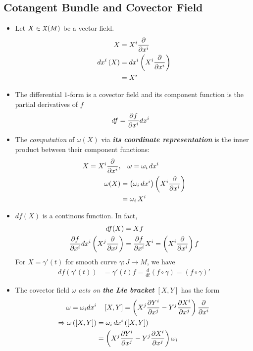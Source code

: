 \documentclass[11pt]{article}
\begin{document}
\subsection{Cotangent Bundle and Covector Field}
\begin{itemize}
\item Let $X \in {\mathfrak X}(M)$ be a vector field. 
\begin{align}
X &=X^i \frac{\partial }{ \partial x^i} \nonumber\\
dx^i \left(X\right) &= dx^i \left(X^i \frac{\partial }{ \partial x^i}\right) \nonumber\\
&= X^i \label{eqn: basis_covector_field_on_vector_field}
\end{align}

\item The differential $1$-form is a covector field and its component function is the partial derivatives of $f$
\begin{align*}
df &= \frac{\partial f}{ \partial x^i} dx^i
\end{align*}

\item The \emph{computation} of $\omega(X)$ via \emph{\textbf{its coordinate representation}} is the inner product between their component functions:
\begin{align}
X = X^i \frac{\partial }{ \partial x^i},&\quad \omega = \omega_i\, dx^i  \nonumber\\
\omega(X) &= \left(\omega_i \, dx^{i}\right)\left(X^i \frac{\partial }{ \partial x^i}\right) \nonumber\\
&= \omega_i\,X^i  \label{eqn: covector_field_act_on_vector_field_coordinate}
\end{align}

\item $df(X)$ is a continous function. In fact, 
\begin{align*}
df(X) &= Xf \\
\frac{\partial f}{ \partial x^i}dx^i\left(X^j \frac{\partial }{ \partial x^j}\right) &= \frac{\partial f}{ \partial x^i}X^i = \left(X^i \frac{\partial }{ \partial x^i}\right)f
\end{align*} For $X = \gamma'(t)$ for smooth curve $\gamma: J \rightarrow M$, we have
\begin{align*}
df(\gamma'(t)) &= \gamma'(t)f = \frac{d}{dt}(f\circ \gamma) = (f\circ \gamma)'
\end{align*}

\item The covector field $\omega$ \emph{acts on \textbf{the Lie bracket}} $[X, Y]$ has the form
\begin{align}
\omega = \omega_i dx^i &\quad \left[X , Y\right] = \left(X^j\frac{\partial Y^i}{ \partial x^j} - Y^j\frac{\partial X^i}{ \partial x^j}\right)\frac{\partial }{ \partial x^i} \nonumber\\
\Rightarrow \omega\left(\left[X, Y\right]\right) &= \omega_i \,dx^i\left(\left[X, Y\right]\right) \nonumber\\
&= \left(X^j\frac{\partial Y^i}{ \partial x^j} - Y^j\frac{\partial X^i}{ \partial x^j}\right)\omega_i \label{eqn: covector_field_act_on_lie_bracket}
\end{align}


\end{itemize}
\end{document}
